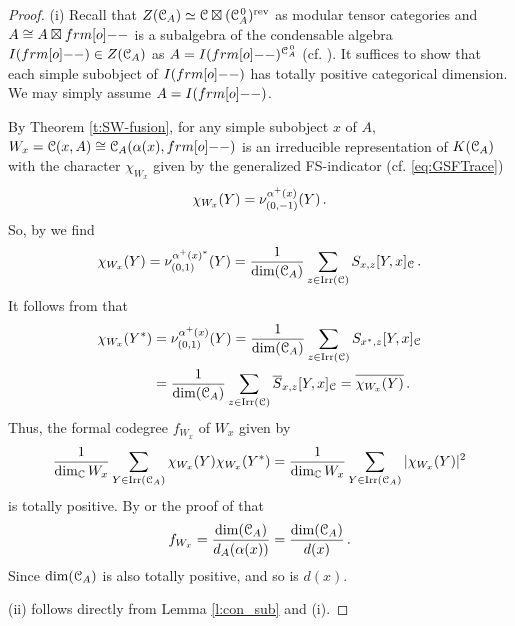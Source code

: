 \documentclass{amsart}
\begin{document}
 \begin{proof}
     (i) Recall that $Z({{\EuScript{C}}_A}) \simeq {\EuScript{C}} \boxtimes ({{\EuScript{C}}_A^{\hspace{1pt}0}})^{\operatorname{rev}}$ as modular tensor categories and $ A \cong A \boxtimes\1$ is a subalgebra of the condensable algebra $I(\1) \in Z(\CA)$ as $A = I(\1)^{\CAo}$ (cf. \cite[Prop. 5.5]{DNRX2025}). It suffices to show that each simple subobject of $I(\1)$ has totally positive categorical dimension. We may simply assume $A = I(\1)$.

     By Theorem \ref{t:SW-fusion}, for any simple subobject $x$ of $A$, $W_x= \CC(x,A) \cong \CA(\a(x), \1)$ is an  irreducible representation of $K({{\EuScript{C}}_A})$ with the character
     $\chi_{W_x}$ given by
      the generalized FS-indicator (cf. \eqref{eq:GSFTrace})
      $$
      \chi_{W_x}(Y) = \nu_{(0,-1)}^{{\alpha}^+(x)}(Y)\,.
      $$
      So, by \cite[Lem. 5.3 and Cor. 5.6]{NS10} we find
      $$
      \chi_{W_x}(Y) = \nu_{(0,1)}^{{\alpha}^+(x)^*}(Y) = \frac{1}{\dim({{\EuScript{C}}_A})} \sum_{z \in \operatorname{Irr}({\EuScript{C}})} S_{x, z}[Y,x]_{\EuScript{C}}\,.
      $$
      It follows from \cite[Prop. 3.3]{NS10} that
      \begin{align*}
          \chi_{W_x}(Y^*) & = \nu_{(0,1)}^{{\alpha}^+(x)}(Y)=\frac{1}{\dim({{\EuScript{C}}_A})} \sum_{z \in \operatorname{Irr}({\EuScript{C}})} S_{x^*, z}[Y,x]_{\EuScript{C}} \\
          &=\frac{1}{\dim({{\EuScript{C}}_A})} \sum_{z \in \operatorname{Irr}({\EuScript{C}})} \overline{S}_{x, z}[Y,x]_{\EuScript{C}} 
          =\overline{\chi_{W_x}(Y)} \,.
      \end{align*}
     Thus, the formal codegree  $f_{W_x}$ of $W_x$ given by  
     $$
      \frac{1}{\dim_{\mathbb{C}} W_x} \sum_{Y \in {\operatorname{Irr}({\EuScript{C}}_A)}} \chi_{W_x}(Y) \chi_{W_x}(Y^*) =\frac{1}{\dim_{\mathbb{C}} W_x} \sum_{Y \in {\operatorname{Irr}({\EuScript{C}}_A)}} |\chi_{W_x}(Y)|^2
     $$   
     is totally positive. By \cite[Thm. 2.13]{O15} or the proof of \cite[Thm. 4.1 (ii)]{DNRX2025} that
     $$
     f_{W_x} = \frac{\dim({{\EuScript{C}}_A})}{d_A({\alpha}(x))} =  \frac{\dim({{\EuScript{C}}_A})}{d(x)}\,.
     $$
     Since $\dim({{\EuScript{C}}_A})$ is also totally positive, and so is $d(x)$.
     
(ii) follows directly from Lemma \ref{l:con_sub} and (i).
 \end{proof}
\end{document}
